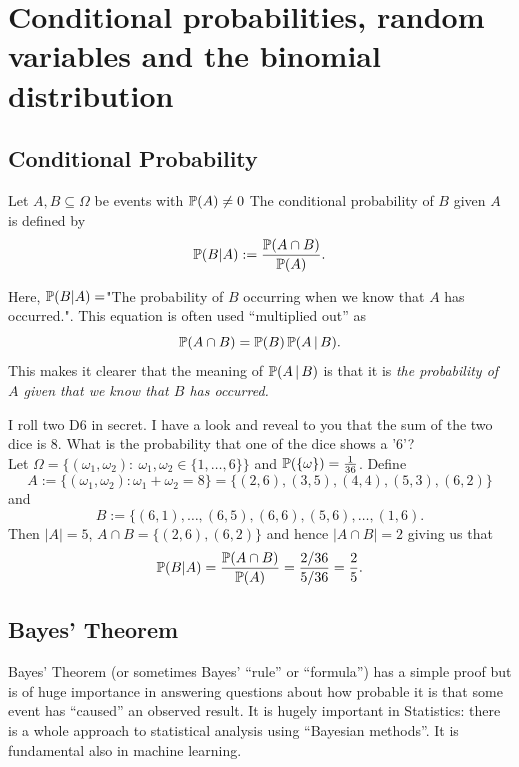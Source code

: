 \section{Conditional probabilities, random variables and the binomial distribution}

\subsection{Conditional Probability}
\begin{defn}
Let $A, B \subseteq \Omega$ be events with ${\mathbb P}(A) \not=0$ The conditional probability of $B$ given $A$ is defined by
\[{\mathbb P}(B \vert A) := \frac{{\mathbb P}(A \cap B)}{{\mathbb P}(A)}.\]
\end{defn}
\noindent Here, ${\mathbb P}( B \vert A)=$"The probability of $B$ occurring when we know that $A$ has occurred.". This equation is often used ``multiplied out'' as
\[{\mathbb P}(A \cap B) = {\mathbb P}(B) \, {\mathbb P}(A \, | \, B). \]
This makes it clearer that the meaning of ${\mathbb P}(A \, | \, B)$ is that it is \emph{the probability of $A$ given that we know that $B$ has occurred.}
\begin{example}
I roll two D6 in secret. I have a look and reveal to you that the sum of the two dice is $8$. What is the probability that one of the dice shows a '$6$'?\\ \linebreak
Let $\Omega = \{ (\omega_1,\omega_2):\ \omega_1,\omega_2 \in \{1, \ldots, 6 \}\}$ and ${\mathbb P}(\{\omega\}) = \frac{1}{36}$. Define 
\[A:=\{ (\omega_1,\omega_2): \omega_1+ \omega_2 = 8 \} = \{ (2,6),(3,5), (4,4), (5,3), (6,2)\}\]
and 
\[B:=\{ (6,1),\ldots,(6,5),(6,6),(5,6),\ldots,(1,6).\]
\linebreak\noindent Then $\vert A \vert =5$, $A \cap B= \{ (2,6),(6,2)\}$ and hence $\vert A \cap B \vert = 2$ giving us that
\[ {\mathbb P}(B \vert A) = \frac{{\mathbb P}(A \cap B)}{{\mathbb P}(A)} = \frac{ 2/36}{5/36} = \frac25.\]
\end{example}

\subsection{Bayes' Theorem} 

Bayes' Theorem (or sometimes Bayes' ``rule'' or ``formula'') has a simple proof but is of huge importance in  answering questions about how probable it is that some event has ``caused'' an observed result.  It is hugely important in Statistics: there is a whole approach to statistical analysis using ``Bayesian methods''.  It is fundamental also in machine learning. 

